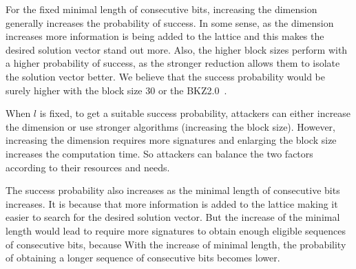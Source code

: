   For the fixed  minimal length of consecutive bits,
 increasing the dimension generally increases the probability of success.
In some sense, as the dimension increases
     more information is being added to the lattice and this makes the desired solution vector stand out more.
Also, the higher block sizes perform with a higher probability of success,
 as the stronger reduction allows them to isolate the solution vector better.
  We believe that the success probability would be surely higher with the block size $30$ or the BKZ2.0~\cite{bkz2}.

When $l$ is fixed, to get a suitable success probability, attackers can either increase the dimension or use stronger algorithms (increasing the block size).
However, increasing the dimension requires more signatures
 and enlarging the block size increases the computation time.
So attackers can balance the two factors according to their resources and needs.

The success probability also increases as the minimal length of consecutive bits increases.
It is because that more information is added to the lattice making it easier to search for the desired solution vector.
But the increase of the minimal length would lead to require more signatures to obtain enough eligible sequences of consecutive bits,
 because With the increase of minimal length, the probability of obtaining  a longer sequence of consecutive bits becomes lower.



